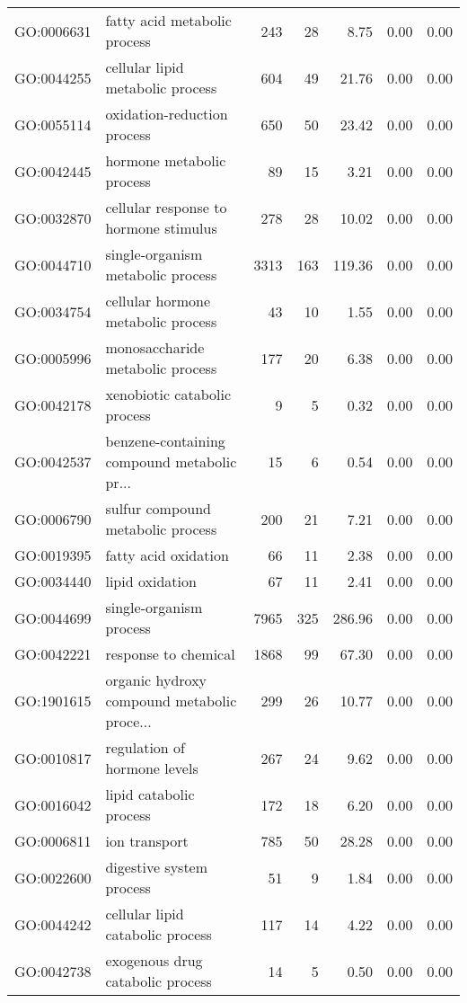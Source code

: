 \begin{table}[ht]
\begin{tabular}{llrrrrr}
  GO:0006631 & fatty acid metabolic process & 243 &  28 & 8.75 & 0.00 & 0.00 \\ 
  GO:0044255 & cellular lipid metabolic process & 604 &  49 & 21.76 & 0.00 & 0.00 \\ 
  GO:0055114 & oxidation-reduction process & 650 &  50 & 23.42 & 0.00 & 0.00 \\ 
  GO:0042445 & hormone metabolic process &  89 &  15 & 3.21 & 0.00 & 0.00 \\ 
  GO:0032870 & cellular response to hormone stimulus & 278 &  28 & 10.02 & 0.00 & 0.00 \\ 
  GO:0044710 & single-organism metabolic process & 3313 & 163 & 119.36 & 0.00 & 0.00 \\ 
  GO:0034754 & cellular hormone metabolic process &  43 &  10 & 1.55 & 0.00 & 0.00 \\ 
  GO:0005996 & monosaccharide metabolic process & 177 &  20 & 6.38 & 0.00 & 0.00 \\ 
  GO:0042178 & xenobiotic catabolic process &   9 &   5 & 0.32 & 0.00 & 0.00 \\ 
  GO:0042537 & benzene-containing compound metabolic pr... &  15 &   6 & 0.54 & 0.00 & 0.00 \\ 
  GO:0006790 & sulfur compound metabolic process & 200 &  21 & 7.21 & 0.00 & 0.00 \\ 
  GO:0019395 & fatty acid oxidation &  66 &  11 & 2.38 & 0.00 & 0.00 \\ 
  GO:0034440 & lipid oxidation &  67 &  11 & 2.41 & 0.00 & 0.00 \\ 
  GO:0044699 & single-organism process & 7965 & 325 & 286.96 & 0.00 & 0.00 \\ 
  GO:0042221 & response to chemical & 1868 &  99 & 67.30 & 0.00 & 0.00 \\ 
  GO:1901615 & organic hydroxy compound metabolic proce... & 299 &  26 & 10.77 & 0.00 & 0.00 \\ 
  GO:0010817 & regulation of hormone levels & 267 &  24 & 9.62 & 0.00 & 0.00 \\ 
  GO:0016042 & lipid catabolic process & 172 &  18 & 6.20 & 0.00 & 0.00 \\ 
  GO:0006811 & ion transport & 785 &  50 & 28.28 & 0.00 & 0.00 \\ 
  GO:0022600 & digestive system process &  51 &   9 & 1.84 & 0.00 & 0.00 \\ 
  GO:0044242 & cellular lipid catabolic process & 117 &  14 & 4.22 & 0.00 & 0.00 \\ 
  GO:0042738 & exogenous drug catabolic process &  14 &   5 & 0.50 & 0.00 & 0.00 \\ 

\end{tabular}
\end{table}
